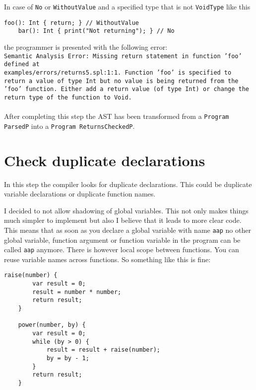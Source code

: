 \documentclass{report}
\begin{document}
In case of \texttt{No} or \texttt{WithoutValue} and a specified type that is not \texttt{VoidType} like this

\begin{lstlisting}[style=SPL]
    foo(): Int { return; } // WithoutValue
    bar(): Int { print("Not returning"); } // No
\end{lstlisting}

the programmer is presented with the following error:\\

\noindent\texttt{\textcolor{error}{Semantic Analysis Error: Missing return statement} in function '\textcolor{name}{foo}' defined at \\\textcolor{filename}{examples/errors/returns5.spl:1:1.}
Function '\textcolor{name}{foo}' is specified to return a value of type \textcolor{type}{Int} but no value is being returned from the '\textcolor{name}{foo}' function.
Either add a return value (of type \textcolor{type}{Int}) or change the return type of the function to \textcolor{type}{Void}.}
\\\\
\noindent After completing this step the AST has been transformed from a \texttt{Program ParsedP} into a \texttt{Program ReturnsCheckedP}.

\section{Check duplicate declarations} \label{sec:Check-duplicate-decls}

In this step the compiler looks for duplicate declarations. This could be duplicate variable declarations or duplicate function names.

I decided to not allow shadowing of global variables. This not only makes things much simpler to implement but also I believe that it leads to more clear code. This means that as soon as you declare a global variable with name \texttt{aap} no other global variable, function argument or function variable in the program can be called \texttt{aap} anymore. There is however local scope between functions. You can reuse variable names across functions. So something like this is fine:

\begin{lstlisting}[style=SPL]
    raise(number) {
        var result = 0;
        result = number * number;
        return result; 
    }
    
    power(number, by) { 
        var result = 0;
        while (by > 0) { 
            result = result + raise(number); 
            by = by - 1;
        }
        return result;
    }
\end{lstlisting}
\end{document}
